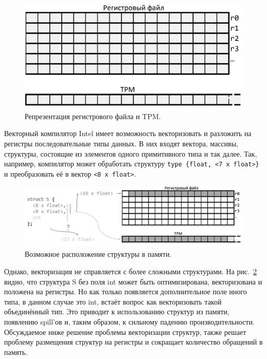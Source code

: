 \begin{figure}[ht]
    \centering
    \includegraphics[scale=0.17]{Images/grf_empty.png}
    \caption{Репрезентация регистрового файла и TPM.}
    \label{fig:mem}
\end{figure}

Векторный компилятор Intel имеет возможность векторизовать и разложить на регистры последовательные типы данных. В них входят вектора, массивы, структуры, состоящие из элементов одного примитивного типа и так далее.
Так, например, компилятор может обработать структуру \verb|type {float, <7 x float>}| и преобразовать её в вектор \verb|<8 x float>|.

\begin{figure}[ht]
    \centering
    \includegraphics[scale=0.22]{Images/struct_gray.png}
    \caption{Возможное расположение структуры в памяти.}
    \label{fig:lying}
\end{figure}

Однако, векторизация не справляется с более сложными структурами. На рис.~\ref{fig:lying} видно, что структура S без поля int может быть оптимизирована, векторизована и положена на регистры.
Но как только появляется дополнительное поле иного типа, в данном случае это int, встаёт вопрос как векторизовать такой объединённый тип.
Это приводит к использованию структур из памяти, появлению spill'ов и, таким образом, к сильному падению производительности.
Обсуждаемое ниже решение проблемы векторизации структур, также решает проблему размещения структур на регистры и сокращает количество обращений в память.
